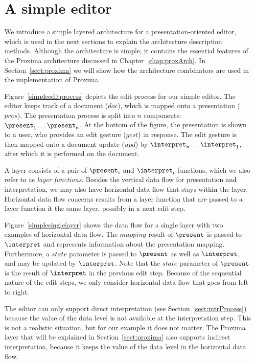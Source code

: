 %																
%																
%																
\section{A simple editor}


We introduce a simple layered architecture for a presentation-oriented editor, which is used in the next sections to explain the architecture description methods. Although the architecture is simple, it contains the essential features of the Proxima architecture discussed in Chapter~\ref{chap:proxArch}. In Section~\ref{sect:proxima} we will show how the architecture combinators are used in the implementation of Proxima.

Figure~\ref{simpleeditprocess} depicts the edit process for our simple editor. The editor keeps track of a document ($doc$), which is mapped onto a presentation ($pres$). The presentation process is split into $n$ components: $\present_1 \dots \present_n$. At the bottom of the figure, the presentation is shown to a user, who provides an edit gesture ($gest$) in response. The edit gesture is then mapped onto a document update ($upd$) by $\interpret_n \dots \interpret_1$, after which it is performed on the document.


A layer consists of a pair of $\present_i$ and $\interpret_i$ functions, which we also refer to as {\em layer functions}. Besides the vertical data flow for presentation and interpretation, we may also have horizontal data flow that stays within the layer. Horizontal data flow concerns results from a layer function that are passed to a layer function it the same layer, possibly in a next edit step.

Figure~\ref{simplesinglelayer} shows the data flow for a single layer with two examples of horizontal data flow. The $mapping$ result of $\present$ is passed to $\interpret$ and represents information about the presentation mapping. Furthermore, a $state$ parameter is passed to $\present$ as well as $\interpret$, and may be updated by $\interpret$. Note that the $state$ parameter of $\present$ is the result of $\interpret$ in the previous edit step. Because of the sequential nature of the edit steps, we only consider horizontal data flow that goes from left to right.

The editor can only support direct interpretation (see Section~\ref{sect:intrProcess}) because the value of the data level is not available at the interpretation step. This is not a realistic situation, but for our example it does not matter. The Proxima layer that will be explained in Section~\ref{sect:proxima} also supports indirect interpretation, because it keeps the value of the data level in the horizontal data flow.

